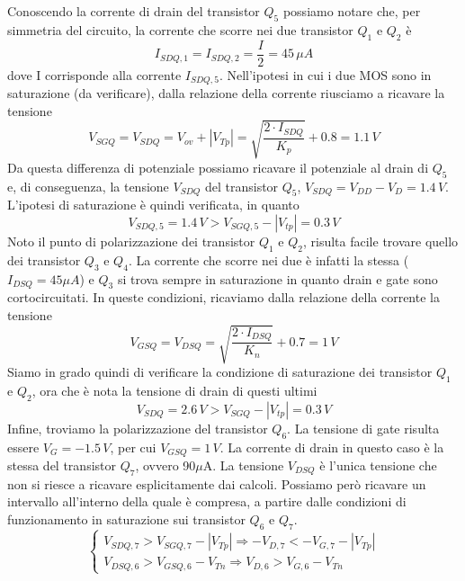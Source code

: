 \documentclass[a4paper,10pt]{article}
\begin{document}
Conoscendo la corrente di drain del transistor $Q_5$ possiamo notare che, per simmetria del circuito, la corrente che scorre nei due transistor $Q_1$ e $Q_2$ è
\begin{equation*}
I_{SDQ,1} = I_{SDQ,2} = \frac{I}{2} = 45\, \mu A
\end{equation*}
dove I corrisponde alla corrente $I_{SDQ,5}$. Nell'ipotesi in cui i due MOS sono in saturazione (da verificare), dalla relazione della corrente riusciamo a ricavare la tensione 
\begin{equation*}
V_{SGQ}= V_{SDQ} = V_{ov} + \left| V_{Tp} \right| = \sqrt{\frac{2 \cdot I_{SDQ}}{K_p}} + 0.8 = 1.1\,V 
\end{equation*}
Da questa differenza di potenziale possiamo ricavare il potenziale al drain di $Q_5$ e, di conseguenza, la tensione $V_{SDQ}$ del transistor $Q_5$, $V_{SDQ}=V_{DD}-V_D=1.4\,V$. L'ipotesi di saturazione è quindi verificata, in quanto
\begin{equation*}
V_{SDQ,5} = 1.4\,V > V_{SGQ,5} - \left| V_{tp} \right| = 0.3\,V
\end{equation*} 
Noto il punto di polarizzazione dei transistor $Q_1$ e $Q_2$, risulta facile trovare quello dei transistor $Q_3$ e $Q_4$. La corrente che scorre nei due è infatti la stessa ($I_{DSQ}=45 \mu A$) e $Q_3$ si trova sempre in saturazione in quanto drain e gate sono cortocircuitati. In queste condizioni, ricaviamo dalla relazione della corrente la tensione
\begin{equation*}
V_{GSQ}= V_{DSQ} = \sqrt{\frac{2 \cdot I_{DSQ}}{K_n}} + 0.7 = 1\,V
\end{equation*}
Siamo in grado quindi di verificare la condizione di saturazione dei transistor $Q_1$ e $Q_2$, ora che è nota la tensione di drain di questi ultimi
\begin{equation*}
V_{SDQ}= 2.6\,V > V_{SGQ} - \left| V_{tp} \right| = 0.3\,V
\end{equation*}
Infine, troviamo la polarizzazione del transistor $Q_6$. La tensione di gate risulta essere $V_G=-1.5\,V$, per cui $V_{GSQ}=1\,V$. La corrente di drain in questo caso è la stessa del transistor $Q_7$, ovvero 90$\mu$A. La tensione $V_{DSQ}$ è l'unica tensione che non si riesce a ricavare esplicitamente dai calcoli. Possiamo però ricavare un intervallo all'interno della quale è compresa, a partire dalle condizioni di funzionamento in saturazione sui transistor $Q_6$ e $Q_7$.
\begin{equation*}
\begin{cases}	
	V_{SDQ,7} > V_{SGQ,7} - \left| V_{Tp} \right|  \Rightarrow -V_{D,7} < -V_{G,7} - \left| V_{Tp} \right|\\ 
	V_{DSQ,6} > V_{GSQ,6} - V_{Tn} \Rightarrow V_{D,6} > V_{G,6} - V_{Tn}
\end{cases}
\end{equation*}
\end{document}
